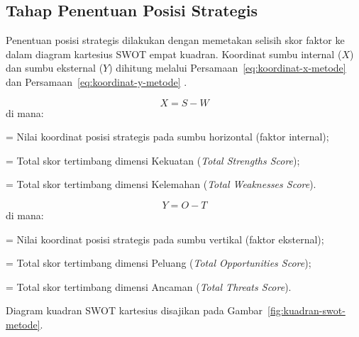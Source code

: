 \subsection{Tahap Penentuan Posisi Strategis}
Penentuan posisi strategis dilakukan dengan memetakan selisih skor faktor ke dalam diagram kartesius SWOT empat kuadran. Koordinat sumbu internal ($X$) dan sumbu eksternal ($Y$) dihitung melalui Persamaan~\ref{eq:koordinat-x-metode} dan Persamaan~\ref{eq:koordinat-y-metode} \parencite{rangkuti2016analisisSWOT}.

\begin{equation}
    \label{eq:koordinat-x-metode}
    X = S - W
\end{equation}
di mana:
\begin{description}[font=\normalfont\itshape, leftmargin=2em, style=sameline, nosep]
    \item[$X$] = Nilai koordinat posisi strategis pada sumbu horizontal (faktor internal);
    \item[$S$] = Total skor tertimbang dimensi Kekuatan (\textit{Total Strengths Score});
    \item[$W$] = Total skor tertimbang dimensi Kelemahan (\textit{Total Weaknesses Score}).
\end{description}

\begin{equation}
    \label{eq:koordinat-y-metode}
    Y = O - T
\end{equation}
di mana:
\begin{description}[font=\normalfont\itshape, leftmargin=2em, style=sameline, nosep]
    \item[$Y$] = Nilai koordinat posisi strategis pada sumbu vertikal (faktor eksternal);
    \item[$O$] = Total skor tertimbang dimensi Peluang (\textit{Total Opportunities Score});
    \item[$T$] = Total skor tertimbang dimensi Ancaman (\textit{Total Threats Score}).
\end{description}

Diagram kuadran SWOT kartesius disajikan pada Gambar~\ref{fig:kuadran-swot-metode}.

